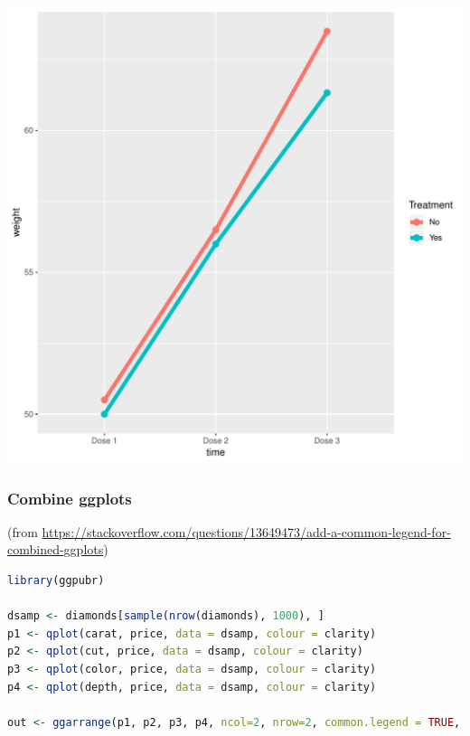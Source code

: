 \documentclass{article}
\begin{document}
\begin{center}
\includegraphics[width=.9\linewidth]{./figures/fig-meanTime5.pdf}
\label{}
\end{center}

\clearpage
\subsubsection{Combine ggplots}
\label{sec:orgfe84db0}
(from \url{https://stackoverflow.com/questions/13649473/add-a-common-legend-for-combined-ggplots})

\begin{lstlisting}[language=r,numbers=none]
library(ggpubr)

dsamp <- diamonds[sample(nrow(diamonds), 1000), ]
p1 <- qplot(carat, price, data = dsamp, colour = clarity)
p2 <- qplot(cut, price, data = dsamp, colour = clarity)
p3 <- qplot(color, price, data = dsamp, colour = clarity)
p4 <- qplot(depth, price, data = dsamp, colour = clarity) 

out <- ggarrange(p1, p2, p3, p4, ncol=2, nrow=2, common.legend = TRUE, legend="bottom")
\end{lstlisting}
\end{document}
